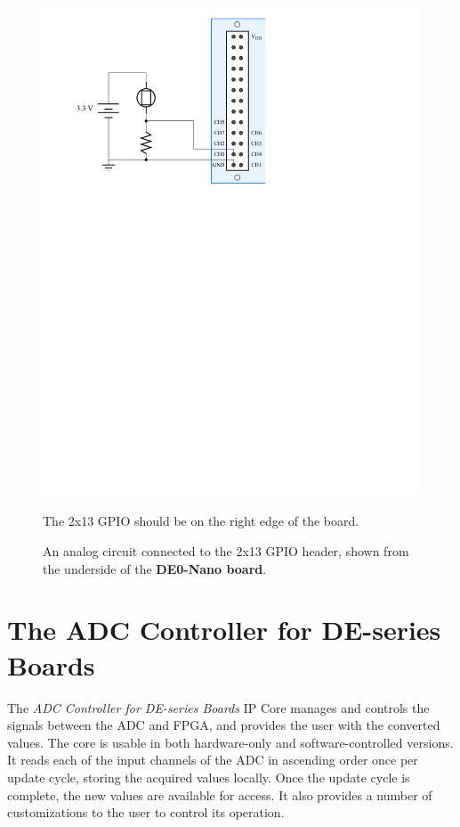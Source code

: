 \documentclass[11pt, twoside, pdftex]{article}
\begin{document}
\begin {figure} [h]
\begin {center}
\includegraphics[scale=0.8] {figures/analog_gpio.pdf}
\end{center}
\caption {An analog circuit connected to the 2x13 GPIO header, shown from the underside of the {\bf DE0-Nano board}.}
\begin{center}The 2x13 GPIO should be on the right edge of the board.\end{center} 
\label{fig:analog_gpio2}
\end {figure}

\FloatBarrier
\section{The ADC Controller for DE-series Boards} 
The \textit{ADC Controller for DE-series Boards} IP Core manages and controls the signals between the ADC and FPGA, and provides the user with the converted values. The core is usable in both hardware-only and software-controlled versions. It reads each of the input channels of the ADC in ascending order once per update cycle, storing the acquired values locally. Once the update cycle is complete, the new values are available for access. It also provides a number of customizations to the user to control its operation.
\end{document}
